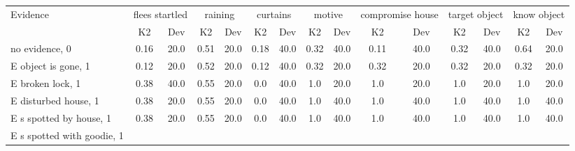 \begin{table}\begin{tabular}{l|cc|cc|cc|cc|cc|cc|cc}\toprule\multirow{2}{*}{Evidence} & \multicolumn{2}{c}{flees startled}& \multicolumn{2}{c}{raining}& \multicolumn{2}{c}{curtains}& \multicolumn{2}{c}{motive}& \multicolumn{2}{c}{compromise house}& \multicolumn{2}{c}{target object}& \multicolumn{2}{c}{know object}\\& {K2} & {Dev}& {K2} & {Dev}& {K2} & {Dev}& {K2} & {Dev}& {K2} & {Dev}& {K2} & {Dev}& {K2} & {Dev}\\\midrule
no evidence, 0 & \cellcolor{Bittersweet}0.16&\cellcolor{Bittersweet}20.0&\cellcolor{Bittersweet}0.51&\cellcolor{Bittersweet}20.0&\cellcolor{Bittersweet}0.18&\cellcolor{Bittersweet}40.0&\cellcolor{Bittersweet}0.32&\cellcolor{Bittersweet}40.0&\cellcolor{Bittersweet}0.11&\cellcolor{Bittersweet}40.0&\cellcolor{Bittersweet}0.32&\cellcolor{Bittersweet}40.0&\cellcolor{Bittersweet}0.64&\cellcolor{Bittersweet}20.0\\E object is gone, 1 & \cellcolor{Bittersweet}0.12&\cellcolor{Bittersweet}20.0&\cellcolor{Bittersweet}0.52&\cellcolor{Bittersweet}20.0&\cellcolor{Bittersweet}0.12&\cellcolor{Bittersweet}40.0&\cellcolor{Bittersweet}0.32&\cellcolor{Bittersweet}20.0&\cellcolor{Bittersweet}0.32&\cellcolor{Bittersweet}20.0&\cellcolor{Bittersweet}0.32&\cellcolor{Bittersweet}20.0&\cellcolor{Bittersweet}0.32&\cellcolor{Bittersweet}20.0\\E broken lock, 1 & \cellcolor{Bittersweet}0.38&\cellcolor{Bittersweet}40.0&\cellcolor{Bittersweet}0.55&\cellcolor{Bittersweet}20.0&\cellcolor{Bittersweet}0.0&\cellcolor{Bittersweet}40.0&\cellcolor{Bittersweet}1.0&\cellcolor{Bittersweet}20.0&\cellcolor{Bittersweet}1.0&\cellcolor{Bittersweet}20.0&\cellcolor{Bittersweet}1.0&\cellcolor{Bittersweet}20.0&\cellcolor{Bittersweet}1.0&\cellcolor{Bittersweet}20.0\\E disturbed house, 1 & \cellcolor{Bittersweet}0.38&\cellcolor{Bittersweet}20.0&\cellcolor{Bittersweet}0.55&\cellcolor{Bittersweet}20.0&\cellcolor{Bittersweet}0.0&\cellcolor{Bittersweet}40.0&\cellcolor{Bittersweet}1.0&\cellcolor{Bittersweet}40.0&\cellcolor{Bittersweet}1.0&\cellcolor{Bittersweet}40.0&\cellcolor{Bittersweet}1.0&\cellcolor{Bittersweet}40.0&\cellcolor{Bittersweet}1.0&\cellcolor{Bittersweet}40.0\\E s spotted by house, 1 & \cellcolor{Bittersweet}0.38&\cellcolor{Bittersweet}20.0&\cellcolor{Bittersweet}0.55&\cellcolor{Bittersweet}20.0&\cellcolor{Bittersweet}0.0&\cellcolor{Bittersweet}40.0&\cellcolor{Bittersweet}1.0&\cellcolor{Bittersweet}40.0&\cellcolor{Bittersweet}1.0&\cellcolor{Bittersweet}40.0&\cellcolor{Bittersweet}1.0&\cellcolor{Bittersweet}40.0&\cellcolor{Bittersweet}1.0&\cellcolor{Bittersweet}40.0\\E s spotted with goodie, 1 & 
\end{tabular}
\end{table}
